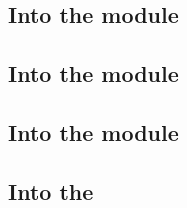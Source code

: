 \subsection{Into the \addMod{} module}                   \label{oob: lookups: add}
\subsection{Into the \modMod{} module}                   \label{oob: lookups: mod}
\subsection{Into the \wcpMod{} module}                   \label{oob: lookups: wcp}
\subsection{Into the \blsRefTable{}}             \label{oob: lookups: blsreftable}
